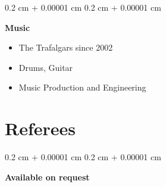 \documentclass[12pt, a4paper]{article}
\newenvironment{highlights}{
    \begin{itemize}[
        topsep=0.10 cm,
        parsep=0.10 cm,
        partopsep=0pt,
        itemsep=0pt,
        leftmargin=0.4 cm + 10pt
    ]
}{
    \end{itemize}
} %
\newenvironment{onecolentry}{
    \begin{adjustwidth}{
        0.2 cm + 0.00001 cm
    }{
        0.2 cm + 0.00001 cm
    }
}{
    \end{adjustwidth}
} %
\begin{document}
        \vspace{0.2 cm}

        \begin{onecolentry}
            \textbf{Music}
            \begin{highlights}
                \item The Trafalgars since 2002
                \item Drums, Guitar
                \item Music Production and Engineering
            \end{highlights}
        \end{onecolentry}



    
    \section{Referees}



        
        \begin{onecolentry}
            \textbf{Available on request}
        \end{onecolentry}



    
\end{document}
